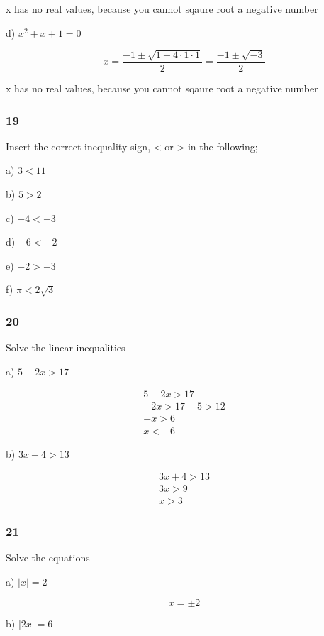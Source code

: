 \documentclass[]{report}
\begin{document}
x has no real values, because you cannot sqaure root a negative number


d) $x^2 + x + 1 = 0$

\[
x = \frac{-1 \pm \sqrt{1 - 4\cdot1\cdot1}}{2} = \frac{-1 \pm \sqrt{-3}}{2}
\]

x has no real values, because you cannot sqaure root a negative number

\subsubsection{19}

Insert the correct inequality sign, < or > in the following;

a) $ 3 < 11$

b) $5 > 2$

c) $-4 < -3 $

d) $-6 < -2$

e) $-2 > -3$

f) $\pi < 2\sqrt{3}$

\subsubsection{20}

Solve the linear inequalities

a) $ 5-2x > 17 $

\begin{align*}
5-2x > 17  \\
-2x > 17 - 5 > 12 \tag*{taking 5 off}\\
-x > 6 \tag*{dividing by 2}\\
x < -6 \tag*{multiplying by -1}
\end{align*}

b) $ 3x + 4 > 13$

\begin{align*}
3x + 4 > 13 \\
3x > 9 \tag*{taking 4 off}\\
x > 3 \tag*{dividing by 3}
\end{align*}

\subsubsection{21}

Solve the equations

a) $|x| = 2 $

\[
x = \pm 2
\]

b) $|2x| = 6$
\end{document}
